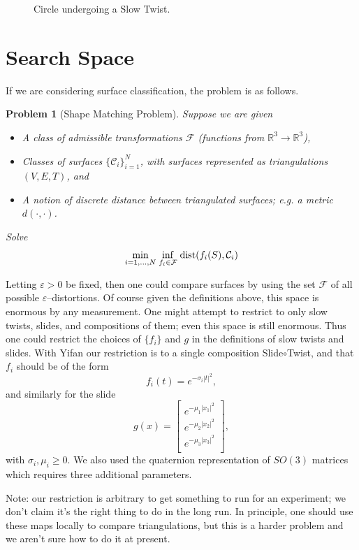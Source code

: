 \documentclass{amsart}
\newtheorem{problem}[theorem]{Problem}
\theoremstyle{remark}
\theoremstyle{definition}
\newcommand{\R}{\mathbb{R}}
\newcommand{\eps}{\varepsilon}
\begin{document}
\begin{figure}[h!]
    \centering
    \caption{Circle undergoing a Slow Twist.}
\end{figure}

\newpage

\section{Search Space}

If we are considering surface classification, the problem is as follows.
\begin{problem}[Shape Matching Problem]
Suppose we are given 
\begin{itemize}
\item A class of admissible transformations $\mathcal{F}$ (functions from $\R^3\to\R^3$),
\item Classes of surfaces $\{\mathcal{C}_i\}_{i=1}^N$, with surfaces represented as triangulations $(V,E,T)$, and
\item A notion of discrete distance between triangulated surfaces; e.g. a metric $d(\cdot,\cdot)$.
\end{itemize}
Solve 
\begin{equation}\label{EQ:Min}
\underset{i=1,\dots,N}\min\;\underset{f_i\in\mathcal{F}}\inf \;\textnormal{dist}(f_i(S),\mathcal{C}_i)
\end{equation}
\end{problem}

Letting $\eps>0$ be fixed, then one could compare surfaces by using the set $\mathcal{F}$ of all possible $\eps$--distortions.  Of course given the definitions above, this space is enormous by any measurement.  One might attempt to restrict to only slow twists, slides, and compositions of them; even this space is still enormous.  Thus one could restrict the choices of $\{f_i\}$ and $g$ in the definitions of slow twists and slides.  With Yifan our restriction is to a single composition Slide$\circ$Twist, and that $f_i$ should be of the form
\[ f_i(t) = e^{-\sigma_i|t|^2}, \]
and similarly for the slide
\[g(x) = \begin{bmatrix} e^{-\mu_1|x_1|^2}\\ e^{-\mu_2|x_2|^2}\\ e^{-\mu_3|x_3|^2}\\  \end{bmatrix},\]
with $\sigma_i,\mu_i\geq0$.  We also used the quaternion representation of $SO(3)$ matrices which requires three additional parameters.

Note: our restriction is arbitrary to get something to run for an experiment; we don't claim it's the right thing to do in the long run.  In principle, one should use these maps locally to compare triangulations, but this is a harder problem and we aren't sure how to do it at present.
\end{document}
